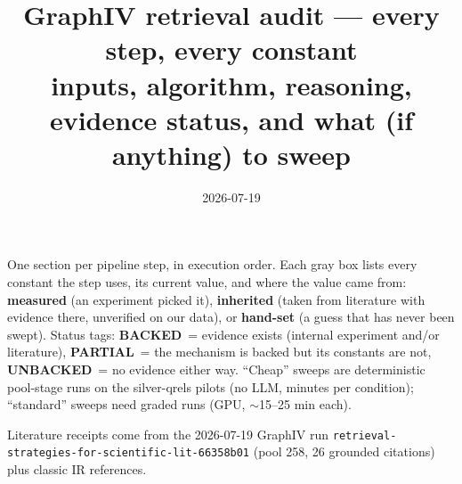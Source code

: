 \documentclass[10pt]{article}
\title{\textbf{GraphIV retrieval audit} --- every step, every constant\\
\large inputs, algorithm, reasoning, evidence status, and what (if anything) to sweep}
\author{2026-07-19}
\date{}
\newcommand{\backedyes}{\textcolor{green!50!black}{\textbf{BACKED}}}
\newcommand{\backedpart}{\textcolor{orange!80!black}{\textbf{PARTIAL}}}
\newcommand{\backedno}{\textcolor{red!70!black}{\textbf{UNBACKED}}}
\begin{document}
\maketitle

\noindent One section per pipeline step, in execution order. Each gray box lists every
constant the step uses, its current value, and where the value came from:
\textbf{measured} (an experiment picked it), \textbf{inherited} (taken from literature with
evidence there, unverified on our data), or \textbf{hand-set} (a guess that has never been
swept). Status tags: \backedyes\ = evidence exists (internal experiment and/or literature),
\backedpart\ = the mechanism is backed but its constants are not, \backedno\ = no evidence
either way. ``Cheap'' sweeps are deterministic pool-stage runs on the silver-qrels pilots
(no LLM, minutes per condition); ``standard'' sweeps need graded runs (GPU, ${\sim}$15--25
min each).

\medskip
\noindent Literature receipts come from the 2026-07-19 GraphIV run
\texttt{retrieval-strategies-for-scientific-lit-66358b01} (pool 258, 26 grounded citations)
plus classic IR references.
\end{document}
